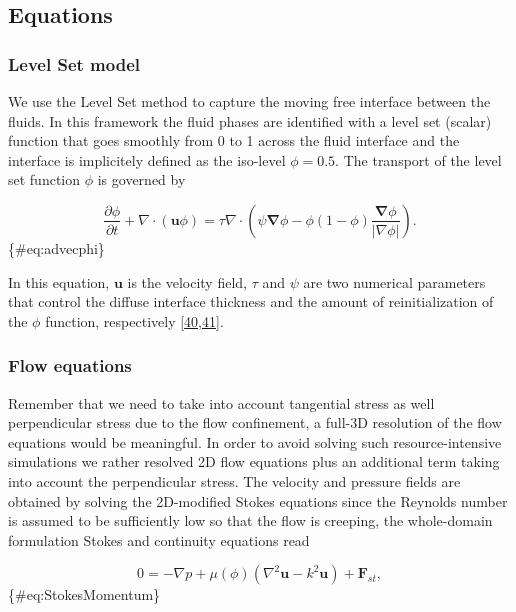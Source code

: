 \documentclass[]{article}
\begin{document}
\hypertarget{equations}{%
\subsection{Equations}\label{equations}}

\hypertarget{level-set-model}{%
\subsubsection{Level Set model}\label{level-set-model}}

We use the Level Set method to capture the moving free interface between
the fluids. In this framework the fluid phases are identified with a
level set (scalar) function that goes smoothly from 0 to 1 across the
fluid interface and the interface is implicitely defined as the
iso-level \(\phi=0.5\). The transport of the level set function \(\phi\)
is governed by

\[
\frac{\partial\phi}{\partial t}+\nabla\cdot(\mathbf{u}\phi)=\tau\nabla\cdot\left(\psi\boldsymbol{\nabla}\phi-\phi(1-\phi)\frac{\boldsymbol{\nabla}\phi}{\vert\nabla\phi\vert}\right).
\] \{\#eq:advecphi\}

In this equation, \(\mathbf{u}\) is the velocity field, \(\tau\) and
\(\psi\) are two numerical parameters that control the diffuse interface
thickness and the amount of reinitialization of the \(\phi\) function,
respectively
{[}\protect\hyperlink{ref-Olsson2005}{40},\protect\hyperlink{ref-Olsson2007}{41}{]}.

\hypertarget{flow-equations}{%
\subsubsection{Flow equations}\label{flow-equations}}

Remember that we need to take into account tangential stress as well
perpendicular stress due to the flow confinement, a full-3D resolution
of the flow equations would be meaningful. In order to avoid solving
such resource-intensive simulations we rather resolved 2D flow equations
plus an additional term taking into account the perpendicular stress.
The velocity and pressure fields are obtained by solving the 2D-modified
Stokes equations since the Reynolds number is assumed to be sufficiently
low so that the flow is creeping, the whole-domain formulation Stokes
and continuity equations read

\[
0=-\nabla p+\mu(\phi)\left(\nabla^{2}\mathbf{u}-k^{2}\mathbf{u}\right)+\mathbf{F}_{st},
\] \{\#eq:StokesMomentum\}
\end{document}
